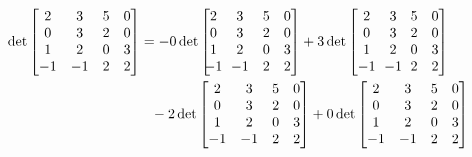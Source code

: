 \begin{applicationActivities}
\begin{observation}
\newcommand{\tikzmark}[2]{\tikz[overlay,remember picture,baseline] \node [anchor=base] (#1) {$#2$};}

\newcommand{\DrawVLine}[3][]{%
  \begin{tikzpicture}[overlay,remember picture]
    \draw[#1] (#2.north) -- (#3.south);
  \end{tikzpicture}
}
\newcommand{\DrawHLine}[3][]{%
  \begin{tikzpicture}[overlay,remember picture]
    \draw[#1] (#2.west) -- (#3.east);
  \end{tikzpicture}
}

  \begin{align*}
\det \begin{bmatrix} 2 & 3 & 5 & 0 \\ 0 & 3 & 2 & 0 \\ 1 & 2 & 0 & 3 \\ -1 & -1 & 2 & 2 \end{bmatrix} &=
- 0 \det \begin{bmatrix} \tikzmark{topA}{2} & 3 & 5 & 0 \\ \tikzmark{leftA}{0} & 3 & 2 & \tikzmark{rightA}{0} \\ 1 & 2 & 0 & 3 \\ \tikzmark{bottomA}{-1} & -1 & 2 & 2 \end{bmatrix}
+ 3 \det \begin{bmatrix} 2 & \tikzmark{topB}{3} & 5 & 0 \\ \tikzmark{leftB}{0} & 3 & 2 & \tikzmark{rightB}{0} \\ 1 & 2 & 0 & 3 \\ -1 & \tikzmark{bottomB}{-1} & 2 & 2 \end{bmatrix}   \\
&\phantom{=} - 2 \det \begin{bmatrix} 2 & 3 & \tikzmark{topC}{5} & 0 \\ \tikzmark{leftC}{0} & 3 & 2 & \tikzmark{rightC}{0} \\ 1 & 2 & 0 & 3 \\ -1 & -1 & \tikzmark{bottomC}{2} & 2 \end{bmatrix}
+ 0 \det \begin{bmatrix} 2 & 3 & 5 & \tikzmark{topD}{0} \\ \tikzmark{leftD}{0} & 3 & 2 & \tikzmark{rightD}{0} \\ 1 & 2 & 0 & 3 \\ -1 & -1 & 2 & \tikzmark{bottomD}{2} \end{bmatrix}  \\

\end{align*}
\end{observation}
\end{applicationActivities}

